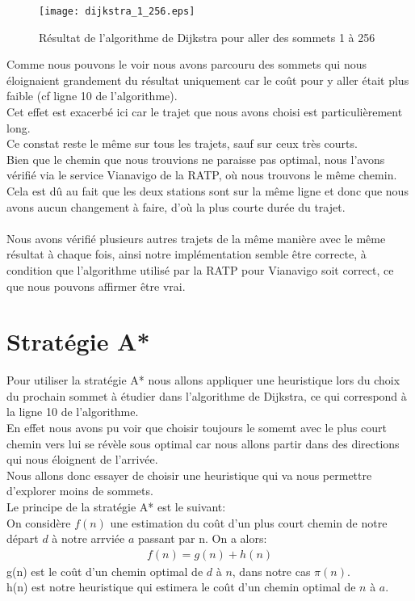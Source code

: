 \documentclass{article}
\begin{document}
\begin{figure}[!hbt]
	\centering
		\texttt{[image: dijkstra\_1\_256.eps]}
	\caption{Résultat de l'algorithme de Dijkstra pour aller des sommets 1 à 256}
	\label{dijkstra_1}
\end{figure}

Comme nous pouvons le voir nous avons parcouru des sommets qui nous éloignaient grandement du résultat
uniquement car le coût pour y aller était plus faible (cf ligne 10 de l'algorithme).\\
Cet effet est exacerbé ici car le trajet que nous avons choisi est particulièrement long.\\
Ce constat reste le même sur tous les trajets, sauf sur ceux très courts.\\

Bien que le chemin que nous trouvions ne paraisse pas optimal, nous l'avons vérifié via
le service Vianavigo de la RATP, où nous trouvons le même chemin. Cela est dû au fait que
les deux stations sont sur la même ligne et donc que nous avons aucun changement à faire,
d'où la plus courte durée du trajet.\\\\
Nous avons vérifié plusieurs autres trajets de la même manière avec le même résultat à chaque
fois, ainsi notre implémentation semble être correcte, à condition que l'algorithme
utilisé par la RATP pour Vianavigo soit correct, ce que nous pouvons affirmer être vrai.

\pagebreak
\section{Stratégie A*}

Pour utiliser la stratégie A* nous allons appliquer une heuristique lors du choix du prochain
sommet à étudier dans l'algorithme de Dijkstra, ce qui correspond à la ligne 10 de l'algorithme.\\
En effet nous avons pu voir que choisir toujours le somemt avec le plus court chemin vers lui
se révèle sous optimal car nous allons partir dans des directions qui nous éloignent de l'arrivée.\\
Nous allons donc essayer de choisir une heuristique qui va nous permettre d'explorer moins de sommets.\\

Le principe de la stratégie A* est le suivant:\\
On considère $f(n)$ une estimation du  coût d'un plus court chemin de notre départ $d$ à notre arrviée $a$ passant par n.
On a alors:
\begin{gather*}
		f(n) = g(n) + h(n)
\end{gather*}
g(n) est le coût d'un chemin optimal de $d$ à $n$, dans notre cas $\pi(n)$.\\
h(n) est notre heuristique qui estimera le coût d'un chemin optimal de $n$ à $a$.\\
\end{document}
